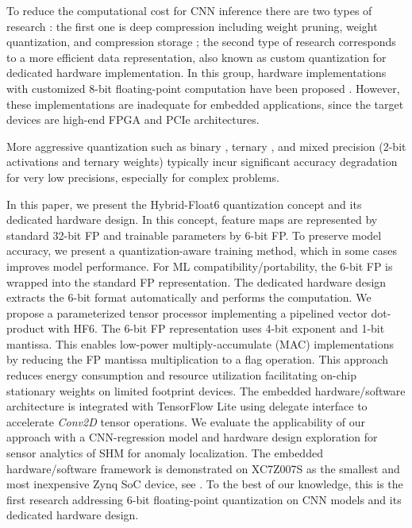 To reduce the computational cost for CNN inference there are two types of research \cite{wu2021low}: the first one is deep compression including weight pruning, weight quantization, and compression storage \cite{han2015deep,han2015learning}; the second type of research corresponds to a more efficient data representation, also known as custom quantization for dedicated hardware implementation. In this group, hardware implementations with customized 8-bit floating-point computation have been proposed \cite{mei2017200mhz, wu2021low, lian2019high}. However, these implementations are inadequate for embedded applications, since the target devices are high-end FPGA and PCIe architectures.

More aggressive quantization such as binary \cite{courbariaux2015binaryconnect}, ternary \cite{lin2015neural}, and mixed precision (2-bit activations and ternary weights) \cite{colangelo2018exploration} typically incur significant accuracy degradation for very low precisions, especially for complex problems\cite{faraone2019addnet}.

In this paper, we present the Hybrid-Float6 quantization concept and its dedicated hardware design. In this concept, feature maps are represented by standard 32-bit FP and trainable parameters by 6-bit FP. To preserve model accuracy, we present a quantization-aware training method, which in some cases improves model performance. For ML compatibility/portability, the 6-bit FP is wrapped into the standard FP representation. The dedicated hardware design extracts the 6-bit format automatically and performs the computation. We propose a parameterized tensor processor implementing a pipelined vector dot-product with HF6. The 6-bit FP representation uses 4-bit exponent and 1-bit mantissa. This enables low-power multiply-accumulate (MAC) implementations by reducing the FP mantissa multiplication to a flag operation. This approach reduces energy consumption and resource utilization facilitating on-chip stationary weights on limited footprint devices. The embedded hardware/software architecture is integrated with TensorFlow Lite using delegate interface to accelerate \emph{Conv2D} tensor operations. We evaluate the applicability of our approach with a CNN-regression model and hardware design exploration for sensor analytics of SHM for anomaly localization. The embedded hardware/software framework is demonstrated on XC7Z007S as the smallest and most inexpensive Zynq SoC device, see . To the best of our knowledge, this is the first research addressing 6-bit floating-point quantization on CNN models and its dedicated hardware design.

